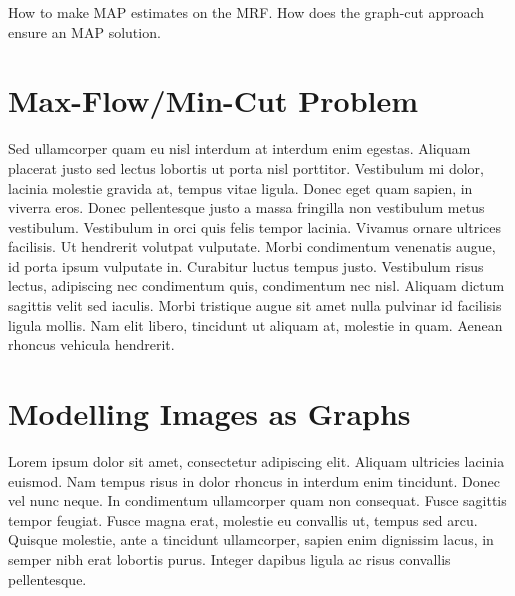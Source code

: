 How to make MAP estimates on the MRF. How does the graph-cut approach ensure an MAP solution.


\section{Max-Flow/Min-Cut Problem}
\label{sec:MaxFlowMinCutProblem}

Sed ullamcorper quam eu nisl interdum at interdum enim egestas. Aliquam placerat justo sed lectus lobortis ut porta nisl porttitor. Vestibulum mi dolor, lacinia molestie gravida at, tempus vitae ligula. Donec eget quam sapien, in viverra eros. Donec pellentesque justo a massa fringilla non vestibulum metus vestibulum. Vestibulum in orci quis felis tempor lacinia. Vivamus ornare ultrices facilisis. Ut hendrerit volutpat vulputate. Morbi condimentum venenatis augue, id porta ipsum vulputate in. Curabitur luctus tempus justo. Vestibulum risus lectus, adipiscing nec condimentum quis, condimentum nec nisl. Aliquam dictum sagittis velit sed iaculis. Morbi tristique augue sit amet nulla pulvinar id facilisis ligula mollis. Nam elit libero, tincidunt ut aliquam at, molestie in quam. Aenean rhoncus vehicula hendrerit.


\section{Modelling Images as Graphs}
\label{sec:MRFImageModelling}

Lorem ipsum dolor sit amet, consectetur adipiscing elit. Aliquam ultricies lacinia euismod. Nam tempus risus in dolor rhoncus in interdum enim tincidunt. Donec vel nunc neque. In condimentum ullamcorper quam non consequat. Fusce sagittis tempor feugiat. Fusce magna erat, molestie eu convallis ut, tempus sed arcu. Quisque molestie, ante a tincidunt ullamcorper, sapien enim dignissim lacus, in semper nibh erat lobortis purus. Integer dapibus ligula ac risus convallis pellentesque.

